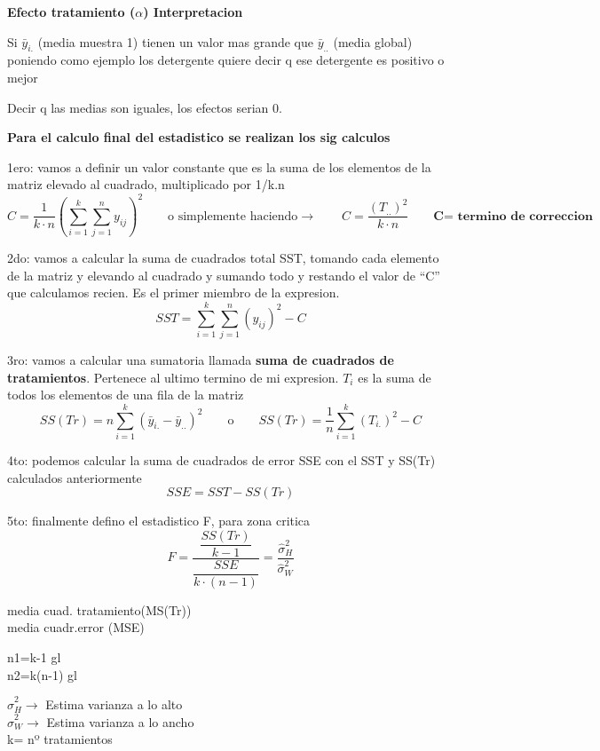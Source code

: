 \documentclass[10pt,a4paper]{article}
\begin{document}
\textbf{Efecto tratamiento ($\alpha$) Interpretacion}

Si $\bar{y}_{i.}$ (media muestra 1) tienen un valor mas grande que $\bar{y}_{..}$ (media global) poniendo como ejemplo los detergente quiere decir q ese detergente es positivo o mejor

Decir q las medias son iguales, los efectos serian 0.

\textbf{Para el calculo final del estadistico se realizan los sig calculos}

1ero: vamos a definir un valor constante que es la suma de los elementos de la matriz elevado al cuadrado, multiplicado por 1/k.n
\[
C = \frac{1}{k\cdot n}\left(\sum_{i=1}^{k}\sum_{j=1}^{n} y_{ij}\right)^2
\qquad \text{o simplemente haciendo} \rightarrow \qquad
C = \frac{(T_{..})^2}{k\cdot n}
\qquad \textbf{C= termino de correccion}
\]

2do: vamos a calcular la suma de cuadrados total SST, tomando cada elemento de la matriz y elevando al cuadrado y sumando todo y restando el valor de ``C'' que calculamos recien. Es el primer miembro de la expresion.
\[
SST = \sum_{i=1}^{k}\sum_{j=1}^{n} \left(y_{ij}\right)^2 - C
\]

3ro: vamos a calcular una sumatoria llamada \textbf{suma de cuadrados de tratamientos}. Pertenece al ultimo termino de mi expresion. $T_i$ es la suma de todos los elementos de una fila de la matriz
\[
SS(Tr) = n\sum_{i=1}^{k} (\bar{y}_{i.}-\bar{y}_{..})^2
\qquad \text{o} \qquad
SS(Tr) = \frac{1}{n}\sum_{i=1}^{k} (T_{i.})^2 - C
\]

4to: podemos calcular la suma de cuadrados de error SSE con el SST y SS(Tr) calculados anteriormente
\[
SSE = SST - SS(Tr)
\]

5to: finalmente defino el estadistico F, para zona critica
\[
F = \frac{\dfrac{SS(Tr)}{k-1}}{\dfrac{SSE}{k\cdot(n-1)}}
= \frac{\hat{\sigma}_H^2}{\hat{\sigma}_W^2}
\]

\begin{minipage}[t]{0.32\textwidth}
\vspace{0pt}
{\small
media cuad. tratamiento(MS(Tr)) \\
media cuadr.error (MSE)
}
\end{minipage}
\begin{minipage}[t]{0.30\textwidth}
\vspace{0pt}
{\small
n1=k-1 gl \\
n2=k(n-1) gl
}
\end{minipage}
\begin{minipage}[t]{0.34\textwidth}
\vspace{0pt}
{\small
$\hat{\sigma}_H^2 \rightarrow$ Estima varianza a lo alto \\
$\hat{\sigma}_W^2 \rightarrow$ Estima varianza a lo ancho \\
k= nº tratamientos
}
\end{minipage}
\end{document}
